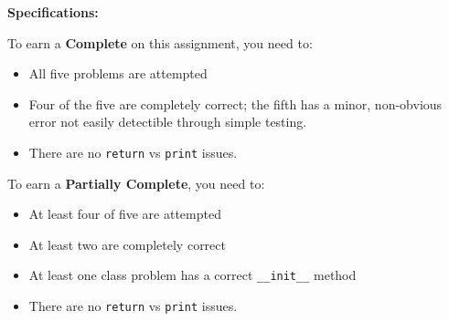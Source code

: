 \documentclass[]{article}
\begin{document}
\vspace{0.2in}

\textbf{Specifications:}

To earn a \textbf{Complete} on this assignment, you need to:
\begin{itemize}
  \item All five problems are attempted
  \item Four of the five are completely correct; the fifth has a minor, non-obvious error not easily detectible through simple testing.
  \item  There are no \verb|return| vs \verb|print| issues.
\end{itemize}

To earn a \textbf{Partially Complete}, you need to:
\begin{itemize}
  \item  At least four of five are attempted
  \item  At least two are completely correct
  \item  At least one class problem has a correct \verb|__init__| method
  \item  There are no \verb|return| vs \verb|print| issues. 
\end{itemize}
\end{document}
